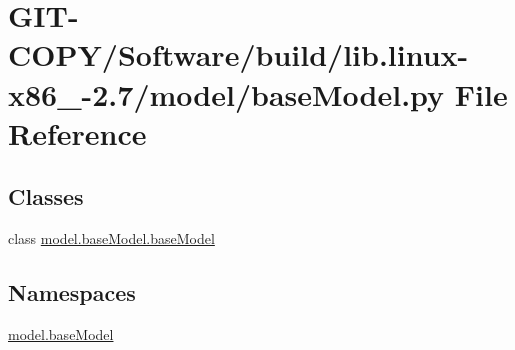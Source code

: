 \hypertarget{GIT-COPY_2Software_2build_2lib_8linux-x86__64-2_87_2model_2baseModel_8py}{}\section{G\+I\+T-\/\+C\+O\+P\+Y/\+Software/build/lib.linux-\/x86\+\_-\/2.7/model/base\+Model.py File Reference}
\label{GIT-COPY_2Software_2build_2lib_8linux-x86__64-2_87_2model_2baseModel_8py}
\subsection*{Classes}
\begin{DoxyCompactItemize}
\item 
class \hyperlink{classmodel_1_1baseModel_1_1baseModel}{model.\+base\+Model.\+base\+Model}
\end{DoxyCompactItemize}
\subsection*{Namespaces}
\begin{DoxyCompactItemize}
\item 
 \hyperlink{namespacemodel_1_1baseModel}{model.\+base\+Model}
\end{DoxyCompactItemize}
